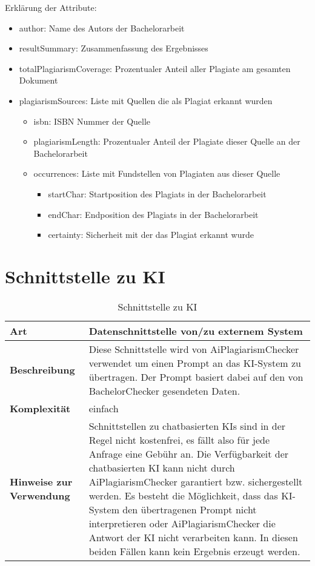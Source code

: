 Erklärung der Attribute:
\begin{itemize}
    \item author: Name des Autors der Bachelorarbeit
    \item resultSummary: Zusammenfassung des Ergebnisses
    \item totalPlagiarismCoverage: Prozentualer Anteil aller Plagiate am gesamten Dokument
    \item plagiarismSources: Liste mit Quellen die als Plagiat erkannt wurden
    \begin{itemize}
        \item isbn: ISBN Nummer der Quelle
        \item plagiarismLength: Prozentualer Anteil der Plagiate dieser Quelle an der Bachelorarbeit
        \item occurrences: Liste mit Fundstellen von Plagiaten aus dieser Quelle
        \begin{itemize}
            \item startChar: Startposition des Plagiats in der Bachelorarbeit
            \item endChar: Endposition des Plagiats in der Bachelorarbeit
            \item certainty: Sicherheit mit der das Plagiat erkannt wurde
        \end{itemize}
    \end{itemize}
\end{itemize}

\section{Schnittstelle zu KI}\label{sec:schnittstelle-ki}

\begin{table}[H]\label{tab:schnittstelle-ki}
    \begin{tabularx}{\textwidth}{|l|X|}
        \hline
        \textbf{Art} & Datenschnittstelle von/zu externem System \\
        \hline
        \textbf{Beschreibung} & Diese Schnittstelle wird von AiPlagiarismChecker verwendet um einen Prompt an das KI-System zu übertragen.
                                Der Prompt basiert dabei auf den von BachelorChecker gesendeten Daten.\\
        \hline
        \textbf{Komplexität} & einfach \\
        \hline
        \textbf{Hinweise zur Verwendung} & Schnittstellen zu chatbasierten KIs sind in der Regel nicht kostenfrei, es fällt also für jede Anfrage eine Gebühr an.
                                            Die Verfügbarkeit der chatbasierten KI kann nicht durch AiPlagiarismChecker garantiert bzw. sichergestellt werden.
                                            Es besteht die Möglichkeit, dass das KI-System den übertragenen Prompt nicht interpretieren oder AiPlagiarismChecker die Antwort der KI nicht verarbeiten kann.
                                            In diesen beiden Fällen kann kein Ergebnis erzeugt werden.\\
        \hline
    \end{tabularx}
    \caption {Schnittstelle zu KI}
\end{table}